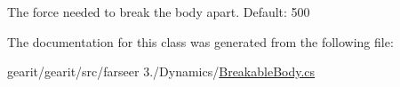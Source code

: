 The force needed to break the body apart. Default\+: 500 



The documentation for this class was generated from the following file\+:\begin{DoxyCompactItemize}
\item 
gearit/gearit/src/farseer 3./\+Dynamics/\hyperlink{_breakable_body_8cs}{Breakable\+Body.\+cs}\end{DoxyCompactItemize}

